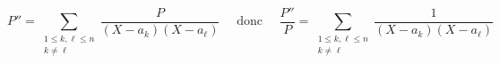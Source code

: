 {\begin{enumerate}
{$$P'' = \sum_{\substack{1\le k,\ell\le n \\ k\not= \ell}}\frac{P}{(X-a_k)(X-a_\ell)} \quad \text{ donc } \quad
\frac{P''}{P} = \sum_{\substack{1\le k,\ell\le n \\ k\not= \ell}}\frac{1}{(X-a_k)(X-a_\ell)}$$
}
\end{enumerate}
}
